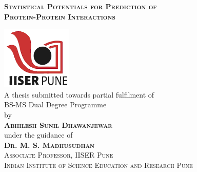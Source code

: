 \begin{titlepage}
\begin{center}

\begin{doublespace}
{\huge \textbf{\textsc{Statistical Potentials for Prediction of\\[0.7cm] Protein-Protein Interactions}}}\\[1.5cm]
\end{doublespace}

\includegraphics[width=0.25\textwidth]{./title/IISER-Pune_logo.png}\\[1.0cm]    

\large A thesis submitted towards partial fulfilment of \\BS-MS Dual Degree Programme\\[1.0cm]
by\\[1.0cm]

\textsc{\textbf{Abhilesh Sunil Dhawanjewar}}\\[1.5cm]

under the guidance of \\[1.5cm]
\textsc{\textbf{Dr. M. S. Madhusudhan}}\\[0.6cm]
\textsc{Associate Professor, IISER Pune}\\[2cm]

\textsc{Indian Institute of Science Education and Research Pune}\\[1cm]

\end{center}
\end{titlepage}
